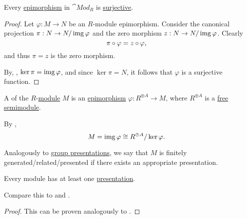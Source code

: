\begin{proposition}\label{thm:module_epimorphisms_are_surjective}
  Every \hyperref[def:morphism_invertibility/right_cancellative]{epimorphism} in \hyperref[def:group/category]{\( \cat{Mod}_R \)} is \hyperref[def:function_invertibility/surjective]{surjective}.
\end{proposition}
\begin{proof}
  Let \( \varphi: M \to N \) be an \( R \)-module epimorphism. Consider the canonical projection \( \pi: N \to N / \operatorname{img} \varphi \) and the zero morphism \( z: N \to N / \operatorname{img} \varphi \). Clearly
  \begin{equation*}
    \pi \bincirc \varphi = z \bincirc \varphi,
  \end{equation*}
  and thus \( \pi = z \) is the zero morphism.

  By, , \( \ker \pi = \operatorname{img} \varphi \), and since \( \ker \pi = N \), it follows that \( \varphi \) is a surjective function.
\end{proof}

\begin{definition}\label{def:module_presentation}
  A  of the \( R \)-\hyperref[def:module]{module} \( M \) is an \hyperref[def:module/homomorphism]{epimorphism} \( \varphi: R^{\oplus A} \to M \), where \( R^{\oplus A} \) is a \hyperref[def:free_semimodule]{free semimodule}.

  By ,
  \begin{equation*}
    M = \operatorname{img} \varphi \cong R^{\oplus A} / \ker \varphi.
  \end{equation*}

  Analogously to \hyperref[def:group_presentation]{group presentations}, we say that \( M \) is finitely generated/related/presented if there exists an appropriate presentation.
\end{definition}

\begin{proposition}\label{thm:module_presentation_existence}
  Every module has at least one \hyperref[def:module_presentation]{presentation}.

  Compare this to  and .
\end{proposition}
\begin{proof}
  This can be proven analogously to .
\end{proof}

